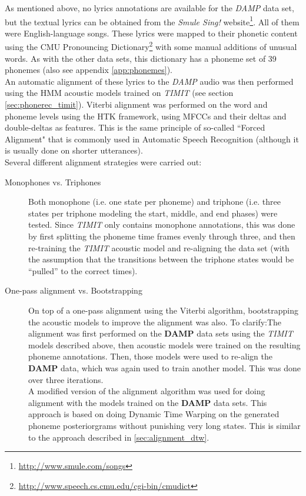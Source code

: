 As mentioned above, no lyrics annotations are available for the \textit{DAMP} data set, but the textual lyrics can be obtained from the \textit{Smule Sing!} website\footnote{\url{http://www.smule.com/songs}}.  All of them were English-language songs. These lyrics were mapped to their phonetic content using the CMU Pronouncing Dictionary\footnote{\url{http://www.speech.cs.cmu.edu/cgi-bin/cmudict}} with some manual additions of unusual words. As with the other data sets, this dictionary has a phoneme set of 39 phonemes (also see appendix \ref{app:phonemes}).\\
An automatic alignment of these lyrics to the \textit{DAMP} audio was then performed using the HMM acoustic models trained on \textit{TIMIT} (see section \ref{sec:phonerec_timit}). Viterbi alignment was performed on the word and phoneme levels using the HTK framework, using MFCCs and their deltas and double-deltas as features. This is the same principle of so-called ``Forced Alignment" that is commonly used in Automatic Speech Recognition \cite{book:jurafsky} (although it is usually done on shorter utterances). \\
Several different alignment strategies were carried out:
\begin{description}
\item[Monophones vs. Triphones] Both monophone (i.e. one state per phoneme) and triphone (i.e. three states per triphone modeling the start, middle, and end phases) were tested. Since \textit{TIMIT} only contains monophone annotations, this was done by first splitting the phoneme time frames evenly through three, and then re-training the \textit{TIMIT} acoustic model and re-aligning the data set (with the assumption that the transitions between the triphone states would be ``pulled'' to the correct times).  
\item[One-pass alignment vs. Bootstrapping] On top of a one-pass alignment using the Viterbi algorithm, bootstrapping the acoustic models to improve the alignment was also. To clarify:The alignment was first performed on the \textbf{DAMP} data sets using the \textit{TIMIT} models described above, then acoustic models were trained on the resulting phoneme annotations. Then, those models were used to re-align the \textbf{DAMP} data, which was again used to train another model. This was done over three iterations.\\
A modified version of the alignment algorithm was used for doing alignment with the models trained on the \textbf{DAMP} data sets. This approach is based on doing Dynamic Time Warping on the generated phoneme posteriorgrams without punishing very long states. This is similar to the approach described in \ref{sec:alignment_dtw}.
\end{description}
